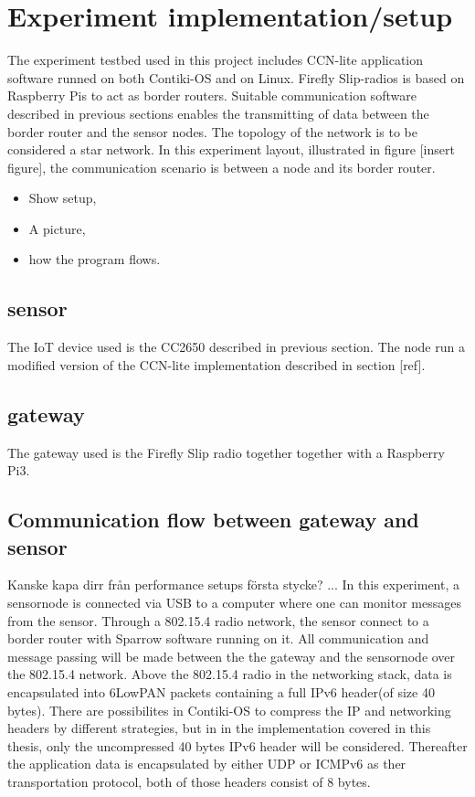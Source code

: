 \section{Experiment implementation/setup}
The experiment testbed used in this project includes CCN-lite application software runned on both Contiki-OS and on Linux. Firefly Slip-radios is based on Raspberry Pis to act as border routers. Suitable communication software described in previous sections enables the transmitting of data between the border router and the sensor nodes. The topology of the network is to be considered a star network. In this experiment layout, illustrated in figure [insert figure], the communication scenario is between a node and its border router.



\begin{itemize}
	\item Show setup,
	\item A picture,
	\item how the program flows.

\end{itemize}
\subsection{sensor}
The IoT device used is the CC2650 described in previous section. The node run a modified version of the CCN-lite implementation described in section [ref].

\subsection{gateway}
The gateway used is the Firefly Slip radio together together with a Raspberry Pi3. 


\subsection{Communication flow between gateway and sensor}
Kanske kapa dirr från performance setups första stycke?
...
In this experiment, a sensornode is connected via USB to a computer where one can monitor messages from the sensor. Through a 802.15.4 radio network, the sensor connect to a border router with Sparrow software running on it. All communication and message passing will be made between the the gateway and the sensornode over the 802.15.4 network. Above the 802.15.4 radio in the networking stack, data is encapsulated into 6LowPAN packets containing a full IPv6 header(of size 40 bytes). There are possibilites in Contiki-OS to compress the IP and networking headers by different strategies, but in in the implementation covered in this thesis, only the uncompressed 40 bytes IPv6 header will be considered. Thereafter the application data is encapsulated by either UDP or ICMPv6 as ther transportation protocol, both of those headers consist of 8 bytes. 
\\\\


